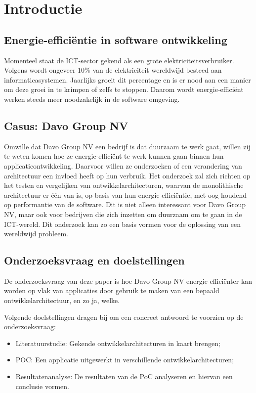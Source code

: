 
\section{Introductie}%
\label{sec:introductie}
\subsection{Energie-efficiëntie in software ontwikkeling}
Momenteel staat de ICT-sector gekend als een grote elektriciteitsverbruiker. Volgens \textcite{Gelenbe2023} wordt ongeveer 10\% van de elektriciteit wereldwijd besteed aan informaticasystemen. Jaarlijks groeit dit percentage en is er nood aan een manier om deze groei in te krimpen of zelfs te stoppen. Daarom wordt energie-efficiënt werken steeds meer noodzakelijk in de software omgeving.  

\subsection{Casus: Davo Group NV}
Omwille dat Davo Group NV een bedrijf is dat duurzaam te werk gaat, willen zij te weten komen hoe ze energie-efficiënt te werk kunnen gaan binnen hun applicatieontwikkeling. Daarvoor willen ze onderzoeken of een verandering van architectuur een invloed heeft op hun verbruik. Het onderzoek zal zich richten op het testen en vergelijken van ontwikkelarchitecturen, waarvan de monolithische architectuur er één van is, op basis van hun energie-efficiëntie, met oog houdend op performantie van de software. Dit is niet alleen interessant voor Davo Group NV, maar ook voor bedrijven die zich inzetten om duurzaam om te gaan in de ICT-wereld. Dit onderzoek kan zo een basis vormen voor de oplossing van een wereldwijd probleem.


\subsection{Onderzoeksvraag en doelstellingen}
De onderzoeksvraag van deze paper is hoe Davo Group NV energie-efficiënter kan worden op vlak van applicaties door gebruik te maken van een bepaald ontwikkelarchitectuur, en zo ja, welke.

Volgende doelstellingen dragen bij om een concreet antwoord te voorzien op de onderzoeksvraag:

\begin{itemize}
    \item Literatuurstudie: Gekende ontwikkelarchitecturen in kaart brengen;
    \item POC: Een applicatie uitgewerkt in verschillende ontwikkelarchitecturen;
    \item Resultatenanalyse: De resultaten van de PoC analyseren en hiervan een conclusie vormen.
\end{itemize}

